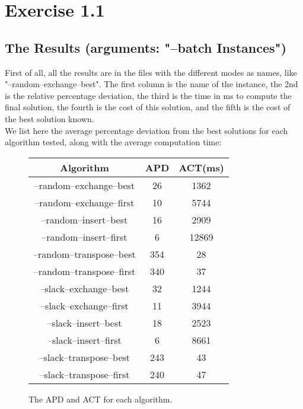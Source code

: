\section{Exercise 1.1}

\subsection{The Results (arguments: "--batch Instances")}
First of all, all the results are in the files with the different modes as names, like "--random--exchange--best". The first column is the name of the instance, the 2nd is the relative percentage deviation, the third is the time in ms to compute the final solution, the fourth is the cost of this solution, and the fifth is the cost of the best solution known.\\

We list here the average percentage deviation from the best solutions for each algorithm tested, along with the average computation time:

\begin{figure}[H]
\begin{center}
	\begin{tabular}{|c|c|c|} \hline
		Algorithm & APD & ACT(ms) \\ \hline \hline
		
		--random--exchange--best		& 26		& 1362 \\ \hline
		--random--exchange--first	& 10		& 5744 \\ \hline
		--random--insert--best		& 16		& 2909 \\ \hline
		--random--insert--first		& 6		& 12869 \\ \hline
		--random--transpose--best	& 354	& 28 \\ \hline
		--random--transpose--first	& 340	& 37 \\ \hline
		--slack--exchange--best		& 32		& 1244 \\ \hline
		--slack--exchange--first		& 11		& 3944 \\ \hline
		--slack--insert--best		& 18		& 2523 \\ \hline
		--slack--insert--first		& 6		& 8661 \\ \hline
		--slack--transpose--best		& 243	& 43 \\ \hline
		--slack--transpose--first	& 240	& 47 \\ \hline
	\end{tabular}
\end{center}
\caption{The APD and ACT for each algorithm.}
\label{al}
\end{figure}

